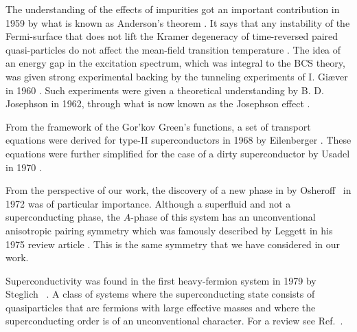 The understanding of the effects of impurities got an important contribution in 1959 by what is known as Anderson's theorem \cite{Anderson59}.
It says that any instability of the Fermi-surface that does not lift the Kramer degeneracy of time-reversed paired quasi-particles do not affect
the mean-field transition temperature \cite{Balatsky06}.
The idea of an energy gap in the excitation spectrum, which was integral to the BCS theory, was given strong experimental backing by the tunneling
experiments of I. Giæver in 1960 \cite{Giaever60}.
Such experiments were given a theoretical understanding by B. D. Josephson in 1962, through what is now known as the Josephson effect
\cite{Josephson62}.

From the framework of the Gor'kov Green's functions, a set of transport equations were derived for type-II superconductors in 1968 by
Eilenberger \cite{Eilenberger68}. These equations were further simplified for the case of a dirty superconductor by Usadel in 1970 \cite{Usadel70}.

From the perspective of our work, the discovery of a new phase in  by Osheroff \etal\ in 1972 was of particular importance. Although a superfluid
and not a superconducting phase, the $A$-phase of this system has an unconventional anisotropic pairing symmetry which was famously described by Leggett in his
1975 review article \cite{Leggett75}. This is the same symmetry that we have considered in our work.

Superconductivity was found in the first heavy-fermion system  in 1979 by Steglich \etal\ \cite{Steglich79}. A class of systems where the superconducting
state consists of quasiparticles that are fermions with large effective masses and where the superconducting order is of an
unconventional character. For a review see Ref.~\cite{White15}.

